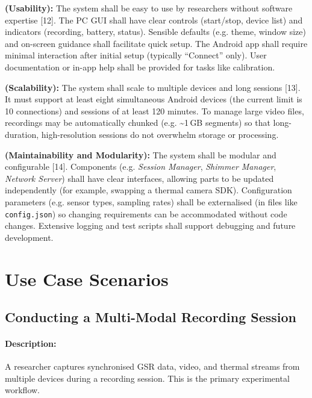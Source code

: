 \begin{description}[style=unboxed,leftmargin=0cm]
    \item[\textbf{NFR6}] \textbf{(Usability):} The system shall be easy to use by researchers without software expertise [12]. The PC GUI shall have clear controls (start/stop, device list) and indicators (recording, battery, status). Sensible defaults (e.g. theme, window size) and on-screen guidance shall facilitate quick setup. The Android app shall require minimal interaction after initial setup (typically “Connect” only). User documentation or in-app help shall be provided for tasks like calibration.

    \item[\textbf{NFR7}] \textbf{(Scalability):} The system shall scale to multiple devices and long sessions [13]. It must support at least eight simultaneous Android devices (the current limit is 10 connections) and sessions of at least 120 minutes. To manage large video files, recordings may be automatically chunked (e.g. \textasciitilde1\,GB segments) so that long-duration, high-resolution sessions do not overwhelm storage or processing.

    \item[\textbf{NFR8}] \textbf{(Maintainability and Modularity):} The system shall be modular and configurable [14]. Components (e.g. \textit{Session Manager}, \textit{Shimmer Manager}, \textit{Network Server}) shall have clear interfaces, allowing parts to be updated independently (for example, swapping a thermal camera SDK). Configuration parameters (e.g. sensor types, sampling rates) shall be externalised (in files like \texttt{config.json}) so changing requirements can be accommodated without code changes. Extensive logging and test scripts shall support debugging and future development.
\end{description}

\section{Use Case Scenarios}

\subsection{Conducting a Multi-Modal Recording Session}

\paragraph{Description:} A researcher captures synchronised GSR data, video, and thermal streams from multiple devices during a recording session. This is the primary experimental workflow.

